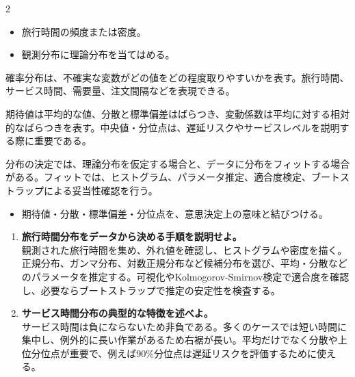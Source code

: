 \clearpage
{}
\begin{multicols}{2}\footnotesize\raggedcolumns
{}
\begin{itemize}
\item 旅行時間の頻度または密度。
\item 観測分布に理論分布を当てはめる。
\end{itemize}
確率分布は、不確実な変数がどの値をどの程度取りやすいかを表す。旅行時間、サービス時間、需要量、注文間隔などを表現できる。\par

期待値は平均的な値、分散と標準偏差はばらつき、変動係数は平均に対する相対的なばらつきを表す。中央値・分位点は、遅延リスクやサービスレベルを説明する際に重要である。\par

分布の決定では、理論分布を仮定する場合と、データに分布をフィットする場合がある。フィットでは、ヒストグラム、パラメータ推定、適合度検定、ブートストラップによる妥当性確認を行う。\par
{}
\begin{itemize}
\item 期待値・分散・標準偏差・分位点を、意思決定上の意味と結びつける。
\end{itemize}
\begin{enumerate}
\item \textbf{旅行時間分布をデータから決める手順を説明せよ。}\\観測された旅行時間を集め、外れ値を確認し、ヒストグラムや密度を描く。正規分布、ガンマ分布、対数正規分布など候補分布を選び、平均・分散などのパラメータを推定する。可視化やKolmogorov-Smirnov検定で適合度を確認し、必要ならブートストラップで推定の安定性を検査する。
\item \textbf{サービス時間分布の典型的な特徴を述べよ。}\\サービス時間は負にならないため非負である。多くのケースでは短い時間に集中し、例外的に長い作業があるため右裾が長い。平均だけでなく分散や上位分位点が重要で、例えば90\%分位点は遅延リスクを評価するために使える。
\end{enumerate}
\end{multicols}

